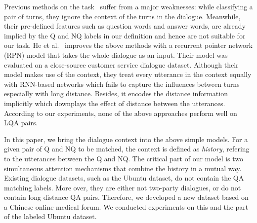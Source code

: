Previous methods on the task~\cite{ding2008using,du2017discovering,jiang2018learning} suffer from a major weaknesses: while classifying a pair of turns, they ignore the context of the turns in the dialogue. Meanwhile, their pre-defined features such as question words and answer words, are already implied by the Q and NQ labels in our definition and hence are not suitable for our task. He et al.~\cite{he2019learning} improves the above methods with a recurrent pointer network (RPN) model that takes the whole dialogue as an input. Their model was evaluated on a close-source customer service dialogue dataset. Although their model makes use of the context, they treat every utterance in the context equally with RNN-based networks which fails to capture the influences between turns especially with long distance. Besides, it encodes the distance information implicitly which downplays the effect of distance between the utterances. According to our experiments, none of the above approaches perform well on LQA pairs.


In this paper, we bring the dialogue context into the above simple models. 
For a given pair of Q and NQ to be matched, the context is defined as {\em history}, 
refering to the utterances between the Q and NQ. The critical part of our model 
is two simultaneous attention mechanisms that combine the history in a mutual way. 
Existing dialogue datasets, such as the Ubuntu dataset, do not contain
the QA matching labels. More over, they are either not two-party dialogues, or do not
contain long distance QA pairs. Therefore, we developed a new dataset based on
a Chinese online medical forum. We conducted experiments on this and the part of
the labeled Ubuntu dataset.  


